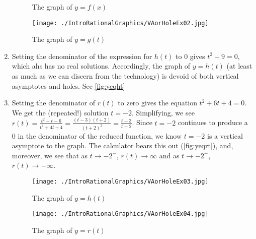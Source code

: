 \begin{ex}
\begin{ex}
\begin{enumerate}
\begin{figure}
\begin{center}
\caption{The graph of $y=f(x)$}
\label{fig:yeqfxeqtwoxbyxsquaredminusthree}
\end{center}
\end{figure}

\begin{figure}
\begin{center}
  
\texttt{[image: ./IntroRationalGraphics/VAorHoleEx02.jpg]}

\caption{The graph of $y=g(t)$}
\label{fig:yeqfxeqtsquaredetc}
\end{center}
\end{figure}

\item  Setting the denominator of the expression for $h(t)$ to $0$ gives $t^2+9 = 0$, which ahs has no real solutions.  Accordingly, the graph of $y=h(t)$ (at least as much as we can discern from the technology) is devoid of both vertical asymptotes and holes. See \autoref{fig:yeqht}

\item  Setting the denominator of $r(t)$ to zero gives the equation $t^2+6t+4 = 0$.  We get  the (repeated!) solution $t=-2$.  Simplifying, we see  $r(t) = \frac{t^2-t-6}{t^2+4t+4} = \frac{(t-3)(t+2)}{(t+2)^2} = \frac{t-3}{t+2}$.  Since $t=-2$ continues to produce a $0$ in the denominator of the reduced function, we know $t=-2$ is a vertical asymptote to the graph.  The calculator bears this out (\autoref{fig:yeqrt}), and, moreover, we see that as $t \rightarrow -2^{-}$, $r(t) \rightarrow \infty$ and as $t \rightarrow -2^{+}$, $r(t) \rightarrow -\infty$.


\begin{figure}
\begin{center}

\texttt{[image: ./IntroRationalGraphics/VAorHoleEx03.jpg]}

\caption{The graph of $y=h(t)$}
\label{fig:yeqht}
\end{center}
\end{figure}

\begin{figure}
\begin{center}
  
\texttt{[image: ./IntroRationalGraphics/VAorHoleEx04.jpg]} 

\caption{The graph of $y=r(t)$}
\label{fig:yeqrt}
\end{center}
\end{figure}


\end{enumerate}
\end{ex}
\end{ex}
